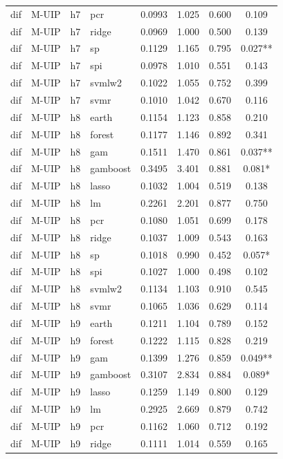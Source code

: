 \begin{ThreePartTable}
\begin{longtable}[t]{llclcccc}
dif & M-UIP & h7 & pcr & 0.0993 & 1.025 & 0.600 & 0.109\\
dif & M-UIP & h7 & ridge & 0.0969 & 1.000 & 0.500 & 0.139\\
dif & M-UIP & h7 & sp & 0.1129 & 1.165 & 0.795 & 0.027**\\
dif & M-UIP & h7 & spi & 0.0978 & 1.010 & 0.551 & 0.143\\
dif & M-UIP & h7 & svmlw2 & 0.1022 & 1.055 & 0.752 & 0.399\\
dif & M-UIP & h7 & svmr & 0.1010 & 1.042 & 0.670 & 0.116\\
\addlinespace
dif & M-UIP & h8 & earth & 0.1154 & 1.123 & 0.858 & 0.210\\
dif & M-UIP & h8 & forest & 0.1177 & 1.146 & 0.892 & 0.341\\
dif & M-UIP & h8 & gam & 0.1511 & 1.470 & 0.861 & 0.037**\\
dif & M-UIP & h8 & gamboost & 0.3495 & 3.401 & 0.881 & 0.081*\\
dif & M-UIP & h8 & lasso & 0.1032 & 1.004 & 0.519 & 0.138\\
dif & M-UIP & h8 & lm & 0.2261 & 2.201 & 0.877 & 0.750\\
dif & M-UIP & h8 & pcr & 0.1080 & 1.051 & 0.699 & 0.178\\
dif & M-UIP & h8 & ridge & 0.1037 & 1.009 & 0.543 & 0.163\\
dif & M-UIP & h8 & sp & 0.1018 & 0.990 & 0.452 & 0.057*\\
dif & M-UIP & h8 & spi & 0.1027 & 1.000 & 0.498 & 0.102\\
dif & M-UIP & h8 & svmlw2 & 0.1134 & 1.103 & 0.910 & 0.545\\
dif & M-UIP & h8 & svmr & 0.1065 & 1.036 & 0.629 & 0.114\\
\addlinespace
dif & M-UIP & h9 & earth & 0.1211 & 1.104 & 0.789 & 0.152\\
dif & M-UIP & h9 & forest & 0.1222 & 1.115 & 0.828 & 0.219\\
dif & M-UIP & h9 & gam & 0.1399 & 1.276 & 0.859 & 0.049**\\
dif & M-UIP & h9 & gamboost & 0.3107 & 2.834 & 0.884 & 0.089*\\
dif & M-UIP & h9 & lasso & 0.1259 & 1.149 & 0.800 & 0.129\\
dif & M-UIP & h9 & lm & 0.2925 & 2.669 & 0.879 & 0.742\\
dif & M-UIP & h9 & pcr & 0.1162 & 1.060 & 0.712 & 0.192\\
dif & M-UIP & h9 & ridge & 0.1111 & 1.014 & 0.559 & 0.165\\

\end{longtable}
\end{ThreePartTable}
